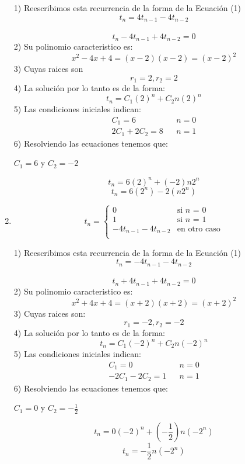 \documentclass{article}
\theoremstyle{definition}
\theoremstyle{remark}
\begin{document}
\begin{enumerate}[1.]
1) Reescribimos esta recurrencia de la forma de la Ecuaci\'on (1) \\
$$ t_n = 4t_{n-1}-4t_{n-2} $$\\
$$ t_n-4t_{n-1}+4t_{n-2}=0 $$
2) Su polinomio caracteristico es:\\
$$ x^{2}-4x+4=(x-2)(x-2)=(x-2)^2$$
3) Cuyas raices son\\ 
$$r_1=2 , r_2=2$$
4) La soluci\'on por lo tanto es de la forma:\\
$$t_n = C_1(2)^{n} + C_2n(2)^{n}$$
5) Las condiciones iniciales indican: \\
\begin{align*}
C_{1}=6& & n=0\\
2C_{1}+2C_{2}=8& & n=1
\end{align*}
6) Resolviendo las ecuaciones tenemos que:\\
\begin{center}
$C_1=6$ y $C_2=-2$
\end{center}
$$t_n=6(2)^{n} + (-2)n2^{n} $$
$$t_n=6(2^{n}) - 2(n2^{n}) $$
\clearpage

\item  $$t_n = \left \{ 
\begin{matrix} 
0 & \mbox{si }n\mbox{ = 0}\\ 
1 & \mbox{si }n\mbox{ = 1}\\
-4t_{n-1}-4t_{n-2} & \mbox{en}\mbox{ otro caso}\\
\end{matrix}
\right. $$

1) Reescribimos esta recurrencia de la forma de la Ecuaci\'on (1) \\
$$ t_n = -4t_{n-1}-4t_{n-2} $$\\
$$ t_n+4t_{n-1}+4t_{n-2}=0 $$
2) Su polinomio caracteristico es:\\
$$ x^{2}+4x+4=(x+2)(x+2)=(x+2)^2$$
3) Cuyas raices son:\\ 
$$r_1=-2 , r_2=-2$$
4) La soluci\'on por lo tanto es de la forma:\\
$$t_n = C_1(-2)^{n} + C_2n(-2)^{n}$$
5) Las condiciones iniciales indican: \\
\begin{align*}
C_{1}=0& & n=0\\
-2C_{1}-2C_{2}=1& & n=1
\end{align*}
6) Resolviendo las ecuaciones tenemos que:\\
\begin{center}
$C_1=0$ y $C_2=-\frac{1}{2}$
\end{center}
$$t_n=0(-2)^{n} + (-\frac{1}{2})n(-2^{n}) $$
$$t_n=-\frac{1}{2}n(-2^{n}) $$
\clearpage



\end{enumerate}
\end{document}
